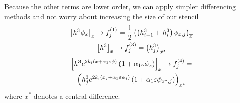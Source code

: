\begin{frame} 
    Because the other terms are lower order, we can apply simpler differencing methods
    and not worry about increasing the size of our stencil
    \begin{gather*}  
        \left[ h^3\phi_x \right]_x \rightarrow f_j^{\left( 1 \right)} = \frac{1}{2}\left( \left( h_{i-1}^3 + h_i^3 \right) \phi_{x, j} \right)_{\overline{x}}\\
        \left[ h^3 \right]_x \rightarrow f_j^{\left( 3 \right)} = \left( h^3_j \right)_{x^*}\\
    \end{gather*}
    \vspace{-4em}
    \begin{multline*}
        \left[ h^3 e^{2k_i \left( x + \alpha_1 \varepsilon \phi \right)} \left( 1 + \alpha_1 \varepsilon \phi_x \right) \right]_x 
        \rightarrow f_j^{\left( 4 \right)} = \\ \left( h^3_j e^{2k_i \left( x_j + \alpha_1 \varepsilon \phi_j \right)} \left( 1 + \alpha_1 \varepsilon \phi_{x^*, j} \right) \right)_{x^*}
    \end{multline*}
    where $x^*$ denotes a central difference. 
\end{frame}